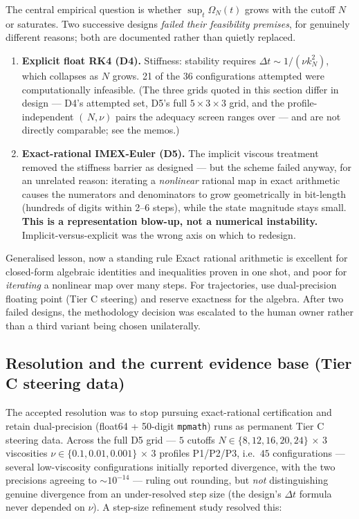 \documentclass[11pt,a4paper]{article}
\newcommand{\tC}{\textcolor{TierC}{\textbf{Tier C}}}
\theoremstyle{definition}
\theoremstyle{plain}
\begin{document}
The central empirical question is whether $\sup_t\Omega_N(t)$ grows with the cutoff $N$ or
saturates. Two successive designs \emph{failed their feasibility premises}, for genuinely
different reasons; both are documented rather than quietly replaced.

\begin{enumerate}[leftmargin=*]
\item \textbf{Explicit float RK4 (D4).} Stiffness: stability requires
$\Delta t\sim1/(\nu k_N^2)$, which collapses as $N$ grows. 21 of the 36 configurations
attempted were computationally infeasible. (The three grids quoted in this section differ in
design --- D4's attempted set, D5's full $5\times3\times3$ grid, and the profile-independent
$(\,N,\nu)$ pairs the adequacy screen ranges over --- and are not directly comparable; see the
memos.)
\item \textbf{Exact-rational IMEX-Euler (D5).} The implicit viscous treatment removed the
stiffness barrier as designed --- but the scheme failed anyway, for an unrelated reason:
iterating a \emph{nonlinear} rational map in exact arithmetic causes the numerators and
denominators to grow geometrically in bit-length (hundreds of digits within 2--6 steps), while
the state magnitude stays small. \textbf{This is a representation blow-up, not a numerical
instability.} Implicit-versus-explicit was the wrong axis on which to redesign.
\end{enumerate}

\begin{keybox}{Generalised lesson, now a standing rule}
Exact rational arithmetic is excellent for closed-form algebraic identities and inequalities
proven in one shot, and poor for \emph{iterating} a nonlinear map over many steps. For
trajectories, use dual-precision floating point (Tier C steering) and reserve exactness for
the algebra. After two failed designs, the methodology decision was escalated to the human
owner rather than a third variant being chosen unilaterally.
\end{keybox}

\subsection{Resolution and the current evidence base (\tC{} steering data)}

The accepted resolution was to stop pursuing exact-rational certification and retain
dual-precision (float64 + 50-digit \texttt{mpmath}) runs as permanent Tier C steering data.
Across the full D5 grid --- $5$ cutoffs $N\in\{8,12,16,20,24\}$ $\times$ $3$ viscosities
$\nu\in\{0.1,0.01,0.001\}$ $\times$ $3$ profiles P1/P2/P3, i.e.\ $45$ configurations --- several
low-viscosity configurations initially
reported divergence, with the two precisions agreeing to $\sim10^{-14}$ --- ruling out
rounding, but \emph{not} distinguishing genuine divergence from an under-resolved step size
(the design's $\Delta t$ formula never depended on $\nu$). A step-size refinement study
resolved this:
\end{document}
